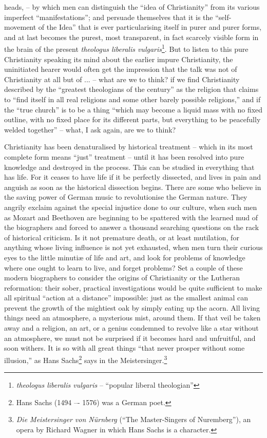 heads, -- by which men can distinguish the \enquote{idea of Christianity} from
its various imperfect \enquote{manifestations}; and persuade themselves that
it is the \enquote{self-movement of the Idea} that is ever particularising
itself in purer and purer forms, and at last becomes the purest, most
transparent, in fact scarcely visible form in the brain of the
present \textit{theologus liberalis vulgaris}\footnote{\textit{theologus liberalis vulgaris} -- \enquote{popular liberal theologian}}. But to listen to this pure
Christianity speaking its mind about the earlier impure Christianity,
the uninitiated hearer would often get the impression that the talk
was not of Christianity at all but of ... -- what are we to think? if
we find Christianity described by the \enquote{greatest theologians of the
century} as the religion that claims to \enquote{find itself in all real
religions and some other barely possible religions,} and if the \enquote{true
church} is to be a thing \enquote{which may become a liquid mass with no
fixed outline, with no fixed place for its different parts, but
everything to be peacefully welded together} -- what, I ask again, are
we to think?

Christianity has been denaturalised by historical treatment -- which in
its most complete form means \enquote{just} treatment -- until it has been
resolved into pure knowledge and destroyed in the process. This can
be studied in everything that has life. For it ceases to have life if
it be perfectly dissected, and lives in pain and anguish as soon as
the historical dissection begins. There are some who believe in the
saving power of German music to revolutionise the German nature. They
angrily exclaim against the special injustice done to our culture,
when such men as Mozart and Beethoven are beginning to be spattered
with the learned mud of the biographers and forced to answer a
thousand searching questions on the rack of historical criticism. Is
it not premature death, or at least mutilation, for anything whose
living influence is not yet exhausted, when men turn their curious
eyes to the little minutiæ of life and art, and look for problems of
knowledge where one ought to learn to live, and forget problems? Set
a couple of these modern biographers to consider the origins of
Christianity or the Lutheran reformation: their sober, practical
investigations would be quite sufficient to make all spiritual
\enquote{action at a distance} impossible: just as the smallest animal can
prevent the growth of the mightiest oak by simply eating up the
acorn. All living things need an atmosphere, a mysterious mist,
around them. If that veil be taken away and a religion, an art, or a
genius condemned to revolve like a star without an atmosphere, we
must not be surprised if it becomes hard and unfruitful, and soon
withers. It is so with all great things \enquote{that never prosper without
some illusion,} as Hans Sachs\footnote{Hans Sachs (1494 –- 1576) was a German poet.} says in the Meistersinger.\footnote{\textit{Die Meistersinger von Nürnberg} (\enquote{The Master-Singers of Nuremberg}), an opera by Richard Wagner in which Hans Sachs is a character.}

